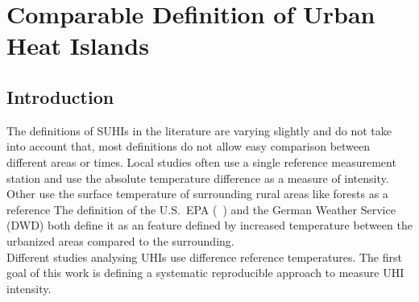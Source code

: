 \documentclass[12pt,a4paper, english,twoside]{article}
\begin{document}
    
\newpage
\section{Comparable Definition of Urban Heat Islands}\label{sec:definition}
    \subsection{Introduction}
      The definitions of \glspl{SUHI} in the literature are varying slightly and do not take into account that, most definitions do not allow easy comparison between different areas or times.
      Local studies often use a single reference measurement station and use the absolute temperature difference as a measure of intensity.
      Other use the surface temperature of surrounding rural areas like forests as a reference%
      The definition of the U.S.~EPA (~\cite{EPA2008}) and the German Weather Service (\gls{DWD}) both define it as an feature defined by increased temperature between the urbanized areas compared to the surrounding.\\ 
      Different studies analysing \glspl{UHI} use difference reference temperatures.
      The first goal of this work is defining a systematic reproducible approach to measure \gls{UHI} intensity.
%
\end{document}
